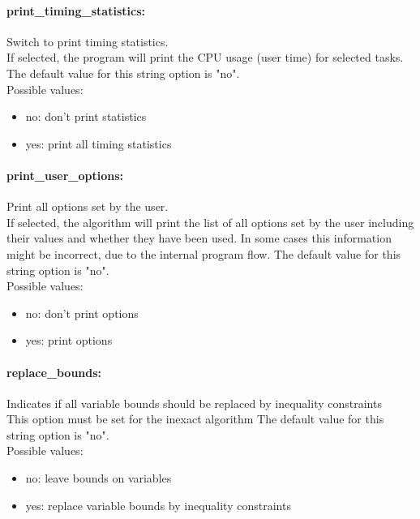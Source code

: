 \paragraph{print\_timing\_statistics:}\label{opt:print_timing_statistics} Switch to print timing statistics. \\
 If selected, the program will print the CPU usage (user time) for selected tasks. The default value for this string option is "no".
\\ 
Possible values:
\begin{itemize}
   \item no: don't print statistics
   \item yes: print all timing statistics
\end{itemize}

\paragraph{print\_user\_options:}\label{opt:print_user_options} Print all options set by the user. \\
 If selected, the algorithm will print the list of all options set by the user including their values and whether they have been used.  In some cases this information might be incorrect, due to the internal program flow. The default value for this string option is "no".
\\ 
Possible values:
\begin{itemize}
   \item no: don't print options
   \item yes: print options
\end{itemize}

\paragraph{replace\_bounds:}\label{opt:replace_bounds} Indicates if all variable bounds should be replaced by inequality constraints \\
 This option must be set for the inexact algorithm The default value for this string option is "no".
\\ 
Possible values:
\begin{itemize}
   \item no: leave bounds on variables
   \item yes: replace variable bounds by inequality constraints
\end{itemize}

